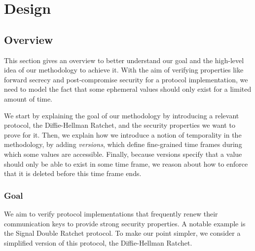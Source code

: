 \chapter{Design}



\section{Overview}
\label{sec:overview}

This section gives an overview to better understand our goal and the high-level idea of our methodology to achieve it.
With the aim of verifying properties like forward secrecy and post-compromise security for a protocol implementation, we need to model the fact that some ephemeral values should only exist for a limited amount of time.

We start by explaining the goal of our methodology by introducing a relevant protocol, the Diffie-Hellman Ratchet, and the security properties we want to prove for it.
Then, we explain how we introduce a notion of temporality in the methodology, by adding  \emph{versions}, which define fine-grained time frames during which some values are accessible.
Finally, because versions specify that a value should only be able to exist in some time frame, we reason about how to enforce that it is deleted before this time frame ends.

\subsection{Goal}
\label{sec:goal}

We aim to verify protocol implementations that frequently renew their communication keys to provide strong security properties.
A notable example is the Signal Double Ratchet protocol. To make our point simpler, we consider a simplified version of this protocol, the Diffie-Hellman Ratchet.

